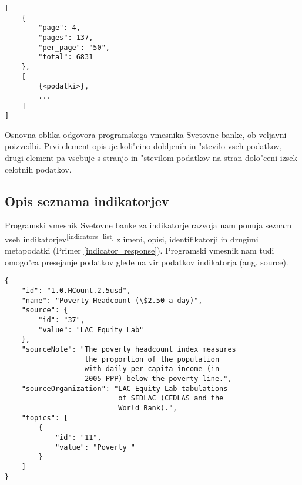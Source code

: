 \begin{snippet}
\begin{center}
\begin{lstlisting}
[
    {
    	"page": 4,
		"pages": 137,
		"per_page": "50",
		"total": 6831
    },
    [
        {<podatki>},
        ...
    ]
]
\end{lstlisting}
\end{center}
\caption{Osnovna oblika odgovora programskega vmesnika Svetovne banke, ob 
veljavni poizvedbi. Prvi element opisuje koli"cino dobljenih in "stevilo vseh 
podatkov, drugi element pa vsebuje s stranjo in "stevilom podatkov na stran 
dolo"ceni izsek celotnih podatkov.}
\label{basic_response}
\end{snippet} 



\subsection{Opis seznama indikatorjev}

Programski vmesnik Svetovne banke za indikatorje razvoja nam ponuja seznam 
vseh indikatorjev\textsuperscript{\ref{indicators_list}} z imeni, opisi, 
identifikatorji in drugimi metapodatki (Primer \ref{indicator_response}).
Programski vmesnik nam tudi omogo"ca presejanje podatkov glede na vir podatkov
indikatorja (ang. source).

\begin{snippet}
\begin{center}
\begin{lstlisting}
{
    "id": "1.0.HCount.2.5usd",
    "name": "Poverty Headcount (\$2.50 a day)",
    "source": {
        "id": "37",
        "value": "LAC Equity Lab"
    },
    "sourceNote": "The poverty headcount index measures 
                   the proportion of the population
                   with daily per capita income (in 
                   2005 PPP) below the poverty line.",
    "sourceOrganization": "LAC Equity Lab tabulations
                           of SEDLAC (CEDLAS and the
                           World Bank).",
    "topics": [
        {
            "id": "11",
            "value": "Poverty "
        }
    ]
}
\end{lstlisting}
\end{center}
\caption{Podatki indikatorja 
stopnja rev"s"cine pri dohodku 2,5 dolarja na dan.}
\label{indicator_response}
\end{snippet} 

